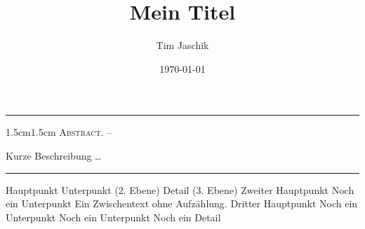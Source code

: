 \documentclass[10pt, letterpaper]{article}
\title{Mein Titel}
\author{Tim Jaschik}
\date{\today}
\renewenvironment{abstract}
  {
    \begin{adjustwidth}{1.5cm}{1.5cm}
    \small
    \textsc{Abstract. –}%
  }
  {
    \end{adjustwidth}
  }
\begin{document}
\maketitle
\rule{\textwidth}{0.5pt}
\begin{abstract}
Kurze Beschreibung …
\end{abstract}
\rule{\textwidth}{0.5pt}
\vspace{0.5cm}




\tableofcontents
\pagebreak




\begin{outline}
  \1 Hauptpunkt
  \2 Unterpunkt (2. Ebene)
  \3 Detail (3. Ebene)
  \1 Zweiter Hauptpunkt
  \2 Noch ein Unterpunkt
  \0   %
  Ein Zwischentext ohne Aufzählung.
  \1 Dritter Hauptpunkt
  \2 Noch ein Unterpunkt
  \2 Noch ein Unterpunkt
  \3 Noch ein Detail
\end{outline}
\end{document}
